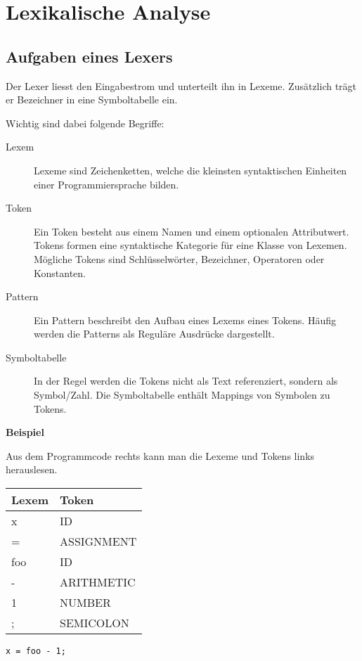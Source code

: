 \section{Lexikalische Analyse}


\subsection{Aufgaben eines Lexers}

Der Lexer liesst den Eingabestrom und unterteilt ihn in Lexeme. Zusätzlich trägt
er Bezeichner in eine Symboltabelle ein.

Wichtig sind dabei folgende Begriffe:

\begin{description}
	\item[Lexem] Lexeme sind Zeichenketten, welche die kleinsten syntaktischen
		Einheiten einer Programmiersprache bilden.
	\item[Token] Ein Token besteht aus einem Namen und einem optionalen
		Attributwert. Tokens formen eine syntaktische Kategorie für eine Klasse von
		Lexemen. Mögliche Tokens sind Schlüsselwörter, Bezeichner, Operatoren oder
		Konstanten.
	\item[Pattern] Ein Pattern beschreibt den Aufbau eines Lexems eines Tokens.
		Häufig werden die Patterns als Reguläre Ausdrücke dargestellt.
	\item[Symboltabelle] In der Regel werden die Tokens nicht als Text
		referenziert, sondern als Symbol/Zahl. Die Symboltabelle enthält Mappings
		von Symbolen zu Tokens.
\end{description}

\textbf{Beispiel}

Aus dem Programmcode rechts kann man die Lexeme und Tokens links
herauslesen.

\begin{minipage}{.4\linewidth}
	\begin{tabular}[h]{|l|l|}
		\hline
		\textbf{Lexem} & \textbf{Token} \\
		\hline
		x & ID \\
		= & ASSIGNMENT \\
		foo & ID \\
		- & ARITHMETIC \\
		1 & NUMBER \\
		; & SEMICOLON \\
		\hline
	\end{tabular}
\end{minipage}
\begin{minipage}{.6\linewidth}
	\large\texttt{x = foo - 1;}
\end{minipage}

